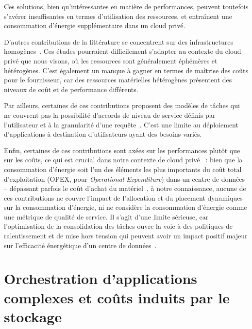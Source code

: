 Ces solutions, bien qu'intéressantes en matière de performances, peuvent toutefois s'avérer insuffisantes en termes d'utilisation des ressources, et entraînent une consommation d'énergie supplémentaire dans un cloud privé.

D'autres contributions de la littérature se concentrent sur des infrastructures homogènes~\cite{gujaratiSwayamDistributedAutoscaling2017, sureshENSUREEfficientScheduling2020, mampageDeadlineawareDynamicResource2021, singhviAtollScalableLowLatency2021, yangINFlessNativeServerless2022}. Ces études pourraient difficilement s'adapter au contexte du cloud privé que nous visons, où les ressources sont généralement éphémères et hétérogènes. C'est également un manque à gagner en termes de maîtrise des coûts pour le fournisseur, car des ressources matérielles hétérogènes présentent des niveaux de coût et de performance différents.

Par ailleurs, certaines de ces contributions proposent des modèles de tâches qui ne couvrent pas la possibilité d'accords de niveau de service définis par l'utilisateur et à la granularité d'une requête~\cite{sureshENSUREEfficientScheduling2020, lingPigeonDynamicEfficient2019}. C'est une limite au déploiement d'applications à destination d'utilisateurs ayant des besoins variés.

Enfin, certaines de ces contributions sont axées sur les performances plutôt que sur les coûts, ce qui est crucial dans notre contexte de cloud privé~\cite{gujaratiSwayamDistributedAutoscaling2017, lingPigeonDynamicEfficient2019, singhviAtollScalableLowLatency2021, choSLADrivenMLInference} : bien que la consommation d'énergie soit l'un des éléments les plus importants du coût total d'exploitation (\gls{OPEX}, pour \textit{Operational Expenditure}) dans un centre de données -- dépassant parfois le coût d'achat du matériel~\cite{7279063}, à notre connaissance, aucune de ces contributions ne couvre l'impact de l'allocation et du placement dynamiques sur la consommation d'énergie, ni ne considère la consommation d'énergie comme une métrique de qualité de service. Il s'agit d'une limite sérieuse, car l'optimisation de la consolidation des tâches ouvre la voie à des politiques de ralentissement et de mise hors tension qui peuvent avoir un impact positif majeur sur l'efficacité énergétique d'un centre de données~\cite{chaurasiaComprehensiveSurveyEnergyaware2021}.

\section{Orchestration d'applications complexes et coûts induits par le stockage}
\label{section:sota-herocache}

